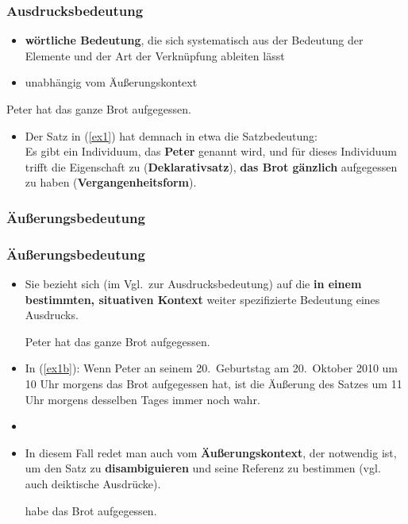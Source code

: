 \begin{frame}
	\frametitle{Ausdrucksbedeutung}


	\begin{itemize}
		\item \textbf{wörtliche Bedeutung}, die sich systematisch aus der Bedeutung der Elemente und der Art der Verknüpfung ableiten lässt
		\medskip
		\item unabhängig vom Äußerungskontext
	\end{itemize} 

\pause 
	\ea \label{ex1}Peter hat das ganze Brot aufgegessen.
	\z
	
\begin{itemize}
	\item Der Satz in (\ref{ex1}) hat demnach in etwa die Satzbedeutung:\\
	Es gibt ein Individuum, das \textbf{Peter} genannt wird,
	und für dieses Individuum trifft die Eigenschaft zu (\textbf{Deklarativsatz}),
	\textbf{das Brot gänzlich} aufgegessen zu haben (\textbf{Vergangenheitsform}).
\end{itemize}

\end{frame}


%
\subsubsection{Äußerungsbedeutung}
%

\begin{frame}
\frametitle{Äußerungsbedeutung}

\begin{itemize}
	\item Sie bezieht sich (im Vgl.\ zur Ausdrucksbedeutung) auf die \textbf{in einem bestimmten, situativen Kontext} weiter spezifizierte Bedeutung eines Ausdrucks.

\pause 
	
	\ea \label{ex1b}Peter hat das ganze Brot aufgegessen.
	\z

	\item In (\ref{ex1b}): Wenn Peter an seinem 20.\ Geburtstag am 20.\ Oktober 2010 um 10 Uhr morgens das Brot aufgegessen hat, ist die Äußerung des Satzes um 11 Uhr morgens desselben Tages immer noch wahr.
	\item[]
	\item In diesem Fall redet man auch vom \textbf{Äußerungskontext}, der notwendig ist, um den Satz zu \textbf{disambiguieren} und seine Referenz zu bestimmen (vgl. auch deiktische Ausdrücke).
	
	\ea \label{ex1c}  habe  das Brot aufgegessen.
	\z
	
\end{itemize}

\end{frame}


